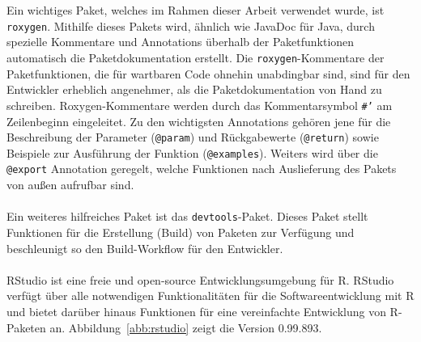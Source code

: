 \\
\\
Ein wichtiges Paket, welches im Rahmen dieser Arbeit verwendet wurde, ist \texttt{roxygen}. Mithilfe dieses Pakets wird, ähnlich wie JavaDoc für Java, durch spezielle Kommentare und Annotations überhalb der Paketfunktionen automatisch die Paketdokumentation erstellt. Die \texttt{roxygen}-Kommentare der Paketfunktionen, die für wartbaren Code ohnehin unabdingbar sind, sind für den Entwickler erheblich angenehmer, als die Paketdokumentation von Hand zu schreiben. Roxygen-Kommentare werden durch das Kommentarsymbol \mbox{\texttt{\#'}} am Zeilenbeginn eingeleitet. Zu den wichtigsten Annotations gehören jene für die Beschreibung der Parameter (\texttt{@param}) und Rückgabewerte (\texttt{@return}) sowie Beispiele zur Ausführung der Funktion (\texttt{@examples}). Weiters wird über die \texttt{@export} Annotation geregelt, welche Funktionen nach Auslieferung des Pakets von außen aufrufbar sind.
\\
\\
Ein weiteres hilfreiches Paket ist das \texttt{devtools}-Paket. Dieses Paket stellt Funktionen für die Erstellung (Build) von Paketen zur Verfügung und beschleunigt so den Build-Workflow für den Entwickler.
\\
\\
RStudio ist eine freie und open-source Entwicklungsumgebung für R. RStudio verfügt über alle notwendigen Funktionalitäten für die Softwareentwicklung mit R und bietet darüber hinaus Funktionen für eine vereinfachte Entwicklung von R-Paketen an. Abbildung~\ref{abb:rstudio} zeigt die Version 0.99.893. 
